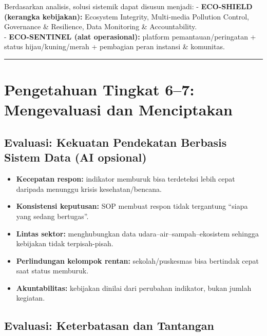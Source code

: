 \documentclass[
  letterpaper,
  DIV=11,
  numbers=noendperiod]{scrreprt}
\providecommand{\tightlist}{%
  \setlength{\itemsep}{0pt}\setlength{\parskip}{0pt}}
\begin{document}
Berdasarkan analisis, solusi sistemik dapat disusun menjadi: -
\textbf{ECO-SHIELD (kerangka kebijakan):} Ecosystem Integrity,
Multi-media Pollution Control, Governance \& Resilience, Data Monitoring
\& Accountability.\\
- \textbf{ECO-SENTINEL (alat operasional):} platform
pemantauan/peringatan + status hijau/kuning/merah + pembagian peran
instansi \& komunitas.

\begin{center}\rule{0.5\linewidth}{0.5pt}\end{center}

\section{Pengetahuan Tingkat 6--7: Mengevaluasi dan
Menciptakan}\label{pengetahuan-tingkat-67-mengevaluasi-dan-menciptakan}

\subsection{Evaluasi: Kekuatan Pendekatan Berbasis Sistem Data (AI
opsional)}\label{evaluasi-kekuatan-pendekatan-berbasis-sistem-data-ai-opsional}

\begin{itemize}
\tightlist
\item
  \textbf{Kecepatan respon:} indikator memburuk bisa terdeteksi lebih
  cepat daripada menunggu krisis kesehatan/bencana.\\
\item
  \textbf{Konsistensi keputusan:} SOP membuat respon tidak tergantung
  ``siapa yang sedang bertugas''.\\
\item
  \textbf{Lintas sektor:} menghubungkan data
  udara--air--sampah--ekosistem sehingga kebijakan tidak
  terpisah-pisah.\\
\item
  \textbf{Perlindungan kelompok rentan:} sekolah/puskesmas bisa
  bertindak cepat saat status memburuk.\\
\item
  \textbf{Akuntabilitas:} kebijakan dinilai dari perubahan indikator,
  bukan jumlah kegiatan.
\end{itemize}

\subsection{Evaluasi: Keterbatasan dan
Tantangan}\label{evaluasi-keterbatasan-dan-tantangan}
\end{document}
